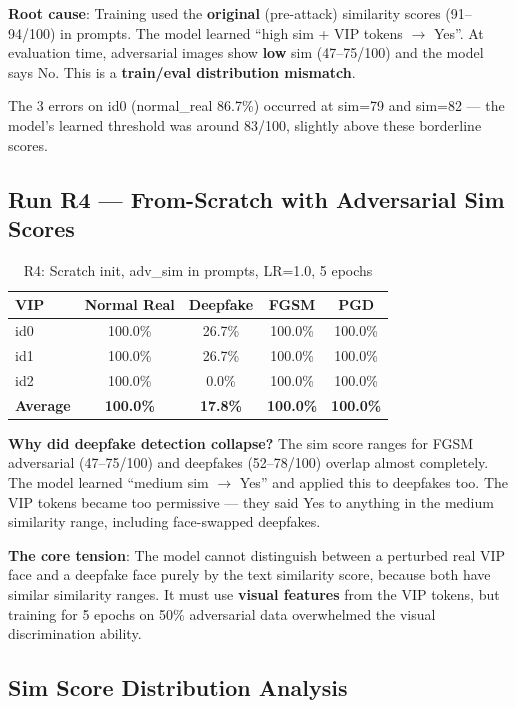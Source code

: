 \documentclass[12pt,a4paper]{article}
\begin{document}
\textbf{Root cause}: Training used the \textbf{original} (pre-attack) similarity scores (91--94/100) in prompts. The model learned ``high sim + VIP tokens $\to$ Yes''. At evaluation time, adversarial images show \textbf{low} sim (47--75/100) and the model says No. This is a \textbf{train/eval distribution mismatch}.

The 3 errors on id0 (normal\_real 86.7\%) occurred at sim=79 and sim=82 --- the model's learned threshold was around 83/100, slightly above these borderline scores.

\subsection{Run R4 --- From-Scratch with Adversarial Sim Scores}

\begin{table}[H]
\centering
\caption{R4: Scratch init, adv\_sim in prompts, LR=1.0, 5 epochs}
\begin{tabular}{@{}lcccc@{}}
\toprule
\textbf{VIP} & \textbf{Normal Real} & \textbf{Deepfake} & \textbf{FGSM} & \textbf{PGD} \\
\midrule
id0 & 100.0\% & 26.7\% & 100.0\% & 100.0\% \\
id1 & 100.0\% & 26.7\% & 100.0\% & 100.0\% \\
id2 & 100.0\% & 0.0\% & 100.0\% & 100.0\% \\
\midrule
\textbf{Average} & \textbf{100.0\%} & \textbf{17.8\%} & \textbf{100.0\%} & \textbf{100.0\%} \\
\bottomrule
\end{tabular}
\end{table}

\textbf{Why did deepfake detection collapse?} The sim score ranges for FGSM adversarial (47--75/100) and deepfakes (52--78/100) overlap almost completely. The model learned ``medium sim $\to$ Yes'' and applied this to deepfakes too. The VIP tokens became too permissive --- they said Yes to anything in the medium similarity range, including face-swapped deepfakes.

\textbf{The core tension}: The model cannot distinguish between a perturbed real VIP face and a deepfake face purely by the text similarity score, because both have similar similarity ranges. It must use \textbf{visual features} from the VIP tokens, but training for 5 epochs on 50\% adversarial data overwhelmed the visual discrimination ability.

\subsection{Sim Score Distribution Analysis}
\end{document}
